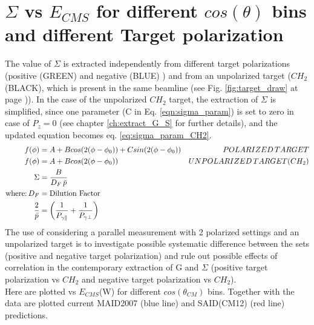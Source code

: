 \begin{figure}[htb]
\ContinuedFloat
  \begin{center} 
  \end{center}
\end{figure}

\clearpage
\newpage

\section{\texorpdfstring{$\Sigma$}{Sigma} vs \texorpdfstring{$E_{CMS}$}{E-CMS} for different \texorpdfstring{$cos(\theta)$}{cos(theta)} bins and different Target polarization}
\label{app:Sigma_TGPOL}
The value of $\Sigma$ is extracted independently from different target polarizations (positive (GREEN)  and negative (BLUE) ) and from an unpolarized target ($CH_2$ (BLACK), which is present in the same beamline (see Fig. \ref{fig:target_draw} at page \pageref{fig:target_draw})). In the case of the unpolarized $CH_2$ target, the extraction of $\Sigma$ is simplified, since one parameter (C in Eq. \ref{eqn:sigma_param}) is set to zero in case of $P_z=0$ (see chapter \ref{ch:extract_G_S} for further details), and the updated equation becomes eq. \ref{eq:sigma_param_CH2}. 
\begin{align}
  f(\phi) & = A + B cos(2(\phi-\phi_0)) + C sin(2(\phi-\phi_0)) & POLARIZED\, TARGET \label{eqn:sigma_param}\\
   f(\phi) & = A + B cos(2(\phi-\phi_0))  & UNPOLARIZED\, TARGET (CH_2) \label{eq:sigma_param_CH2}\\
   \Sigma & = \frac{B}{D_F \, \bar{p}} & \\
   \textnormal{where:} \, D_F & =   \textnormal{Dilution Factor} & \\
    \frac{2}{\bar{p}} & = \left(\frac{1}{P_{\gamma \parallel}} + \frac{1}{P_{\gamma \perp}}\right) &
\end{align}
The use of considering a parallel measurement with 2 polarized settings and an unpolarized target is to investigate possible systematic difference between the sets (positive and negative target polarization) and rule out possible effects of correlation in the contemporary extraction of G and $\Sigma$ (positive target polarization vs $CH_2$ and negative target polarization vs $CH_2$). \\
 Here are plotted vs $E_{CMS}$(W) for different $cos(\theta_{CM})$ bins. Together with the data are plotted current MAID2007 \cite{MAID_2007} (blue line)  and SAID(CM12) \cite{PhysRevC.86.015202} (red line) predictions.

